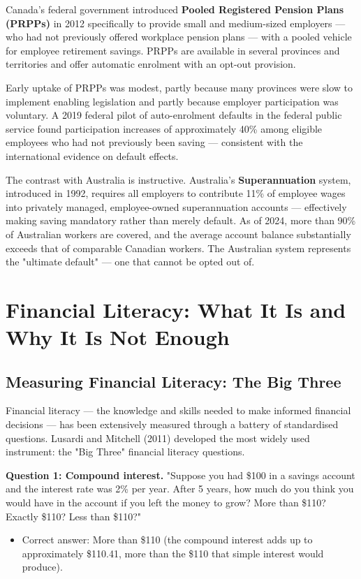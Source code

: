 \documentclass[12pt, letterpaper]{article}
\begin{document}
Canada's federal government introduced \textbf{Pooled Registered Pension Plans (PRPPs)} in 2012 specifically to provide small and medium-sized employers --- who had not previously offered workplace pension plans --- with a pooled vehicle for employee retirement savings. PRPPs are available in several provinces and territories and offer automatic enrolment with an opt-out provision.

Early uptake of PRPPs was modest, partly because many provinces were slow to implement enabling legislation and partly because employer participation was voluntary. A 2019 federal pilot of auto-enrolment defaults in the federal public service found participation increases of approximately 40\% among eligible employees who had not previously been saving --- consistent with the international evidence on default effects.

The contrast with Australia is instructive. Australia's \textbf{Superannuation} system, introduced in 1992, requires all employers to contribute 11\% of employee wages into privately managed, employee-owned superannuation accounts --- effectively making saving mandatory rather than merely default. As of 2024, more than 90\% of Australian workers are covered, and the average account balance substantially exceeds that of comparable Canadian workers. The Australian system represents the "ultimate default" --- one that cannot be opted out of.

\medskip


\section{Financial Literacy: What It Is and Why It Is Not Enough}



\subsection{Measuring Financial Literacy: The Big Three}


Financial literacy --- the knowledge and skills needed to make informed financial decisions --- has been extensively measured through a battery of standardised questions. Lusardi and Mitchell (2011) developed the most widely used instrument: the "Big Three" financial literacy questions.

\textbf{Question 1: Compound interest.} "Suppose you had \$100 in a savings account and the interest rate was 2\% per year. After 5 years, how much do you think you would have in the account if you left the money to grow? More than \$110? Exactly \$110? Less than \$110?"
\begin{itemize}
\item Correct answer: More than \$110 (the compound interest adds up to approximately \$110.41, more than the \$110 that simple interest would produce).
\end{itemize}
\end{document}
